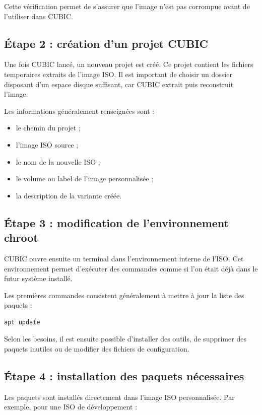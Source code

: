 \documentclass[12pt,a4paper]{article}
\begin{document}
Cette vérification permet de s'assurer que l'image n'est pas corrompue avant de l'utiliser dans CUBIC.

\subsection{Étape 2 : création d'un projet CUBIC}

Une fois CUBIC lancé, un nouveau projet est créé. Ce projet contient les fichiers temporaires extraits de l'image ISO. Il est important de choisir un dossier disposant d'un espace disque suffisant, car CUBIC extrait puis reconstruit l'image.

Les informations généralement renseignées sont :

\begin{itemize}[label=--]
    \item le chemin du projet ;
    \item l'image ISO source ;
    \item le nom de la nouvelle ISO ;
    \item le volume ou label de l'image personnalisée ;
    \item la description de la variante créée.
\end{itemize}

\subsection{Étape 3 : modification de l'environnement chroot}

CUBIC ouvre ensuite un terminal dans l'environnement interne de l'ISO. Cet environnement permet d'exécuter des commandes comme si l'on était déjà dans le futur système installé.

Les premières commandes consistent généralement à mettre à jour la liste des paquets :

\begin{lstlisting}
apt update
\end{lstlisting}

Selon les besoins, il est ensuite possible d'installer des outils, de supprimer des paquets inutiles ou de modifier des fichiers de configuration.

\subsection{Étape 4 : installation des paquets nécessaires}

Les paquets sont installés directement dans l'image ISO personnalisée. Par exemple, pour une ISO de développement :
\end{document}
